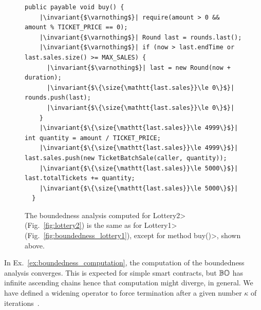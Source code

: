 \begin{example}
  \begin{figure}
    \begin{lstlisting}[language=pseudo,numbers=none]
  public payable void buy() {
    |\invariant{$\varnothing$}| require(amount > 0 && amount % TICKET_PRICE == 0);
    |\invariant{$\varnothing$}| Round last = rounds.last();
    |\invariant{$\varnothing$}| if (now > last.endTime or last.sales.size() >= MAX_SALES) {
      |\invariant{$\varnothing$}| last = new Round(now + duration);
      |\invariant{$\{\size{\mathtt{last.sales}}\le 0\}$}| rounds.push(last);
      |\invariant{$\{\size{\mathtt{last.sales}}\le 0\}$}|
    }
    |\invariant{$\{\size{\mathtt{last.sales}}\le 4999\}$}| int quantity = amount / TICKET_PRICE;
    |\invariant{$\{\size{\mathtt{last.sales}}\le 4999\}$}| last.sales.push(new TicketBatchSale(caller, quantity));
    |\invariant{$\{\size{\mathtt{last.sales}}\le 5000\}$}| last.totalTickets += quantity;
    |\invariant{$\{\size{\mathtt{last.sales}}\le 5000\}$}|
  }
    \end{lstlisting}
    \caption{The boundedness analysis computed for \<Lottery2> (Fig.~\ref{fig:lottery2})
      is the same as for \<Lottery1> (Fig.~\ref{fig:boundedness_lottery1}),
      except for method \<buy()>, shown above.}
    \label{fig:boundedness_lottery2}
  \end{figure}

\end{example}

In Ex.~\ref{ex:boundedness_computation}, the computation of the boundedness analysis
converges. This is expected for simple smart contracts, but
${\mathbb{BO}}$ has infinite ascending chains hence that computation
might diverge, in general. We have defined a widening operator to force
termination after a given number $\kappa$ of iterations~\cite{CousotC77}.

